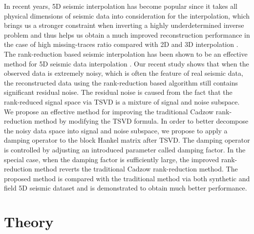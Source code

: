 In recent years, 5D seismic interpolation has become popular since it takes all physical dimensions of seismic data into consideration for the interpolation, which brings us a stronger constraint when inverting a highly underdetermined inverse problem and thus helps us obtain a much improved reconstruction performance in the case of high missing-traces ratio compared with 2D and 3D interpolation \cite[]{liubin2004,kreimer2013,chiu2014,jianjun2015}.
The rank-reduction based seismic interpolation has been shown to be an effective method for 5D seismic data interpolation \cite[]{jianjun2015}. Our recent study shows that when the observed data is extremely noisy, which is often the feature of real seismic data, the reconstructed data using the rank-reduction based algorithm still contains significant residual noise. The residual noise is caused from the fact that the rank-reduced signal space via TSVD is a mixture of signal and noise subspace.  We propose an effective method for improving the traditional Cadzow rank-reduction method by modifying the TSVD formula. In order to better decompose the noisy data space into signal and noise subspace, we propose to apply a damping operator to the block Hankel matrix after TSVD.  The damping operator is controlled by adjusting an introduced parameter called damping factor. In the special case, when the damping factor is sufficiently large, the improved rank-reduction method reverts the traditional Cadzow rank-reduction method. The proposed method is compared with the traditional method via both synthetic and field  5D seismic dataset and is demonstrated to obtain much better performance. 

\section{Theory}
